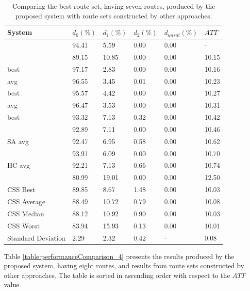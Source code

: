 \begin{table}[H]
    \centering
    \hspace*{-1.0cm}
    \begin{tabular}{|l||l|l|l|l|l|}
    \hline
    \textbf{System} & $d_0(\%)$ & $d_1(\%)$ & $d_2(\%)$ & $d_{unsat}(\%)$ & $ATT$ \\
    \hline
    \citet{nikolic14} & 94.41 & 5.59 & 0.00 & 0.00 & - \\
    \citet{chakroborty02} & 89.15 & 10.85 & 0.00 & 0.00 & 10.15 \\
    \citet{kechagiopoulos14} best & 97.17 & 2.83 & 0.00 & 0.00 & 10.16 \\
    \citet{kechagiopoulos14} avg & 96.55 & 3.45 & 0.01 & 0.00 & 10.23 \\
    \citet{chew12} best & 95.57 & 4.42 & 0.00 & 0.00 & 10.27 \\
    \citet{chew12} avg & 96.47 & 3.53 & 0.00 & 0.00 & 10.31 \\
    \citet{fan10} best & 93.32 & 7.13 & 0.32 & 0.00 & 10.42  \\
    \citet{zhang10} & 92.89 & 7.11 & 0.00 & 0.00 & 10.46 \\
    \citet{fan10} SA avg & 92.47 & 6.95 & 0.58 & 0.00 & 10.62 \\
    \citet{kidwai98} & 93.91 & 6.09 & 0.00 & 0.00 & 10.70 \\
    \citet{fan10} HC avg & 92.21 & 7.13 & 0.66 & 0.00 & 10.74 \\
    \citet{baaj91} & 80.99 & 19.01 & 0.00 & 0.00 & 12.50 \\
    \hline
    CSS Best & 89.85 & 8.67 & 1.48 & 0.00 & 10.03\\
    CSS Average & 88.49 & 10.72 & 0.79 & 0.00 & 10.08\\
    CSS Median & 88.12 & 10.92 & 0.90 & 0.00 & 10.03\\
    CSS Worst & 83.94 & 15.93 & 0.13 & 0.00 & 10.01\\
    Standard Deviation & 2.29 & 2.32 & 0.42 & - & 0.08\\
    \hline
    \end{tabular}
    \caption {Comparing the best route set, having seven routes, produced by the proposed system with route sets constructed by other approaches.}
    \label{table:performanceComparison_7}
\end{table}
Table \vref{table:performanceComparison_4} presents the results produced by the proposed system, having eight routes, and results from route sets constructed by other approaches. The table is sorted in ascending order with respect to the $ATT$ value.

